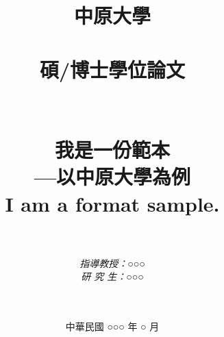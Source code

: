 \documentclass[a4paper, 12pt, oneside, openright]{report}
\begin{document}
\begin{CJK*}{UTF8}{bsmi}
\title{\textbf{中原大學} \\
        \textbf{} \\ 
         \textbf{碩/博士學位論文} \\ 
        \textbf{} \\
        \textbf{} \\
        
        \textbf{我是一份範本} \\ 
        \textbf{—以中原大學為例} \\ 

        \bf{I am a format sample.} }


\author{ \\  \\ 
{\it \Large 指導教授：○○○} \\ 
{\it \Large 研 究 生：○○○} \\ \\ \ }

{\date{中華民國 ○○○ 年 ○ 月}}
\maketitle
\frontmatter




\tableofcontents
\listoffigures
\listoftables
\mainmatter









\end{CJK*}
\end{document}

